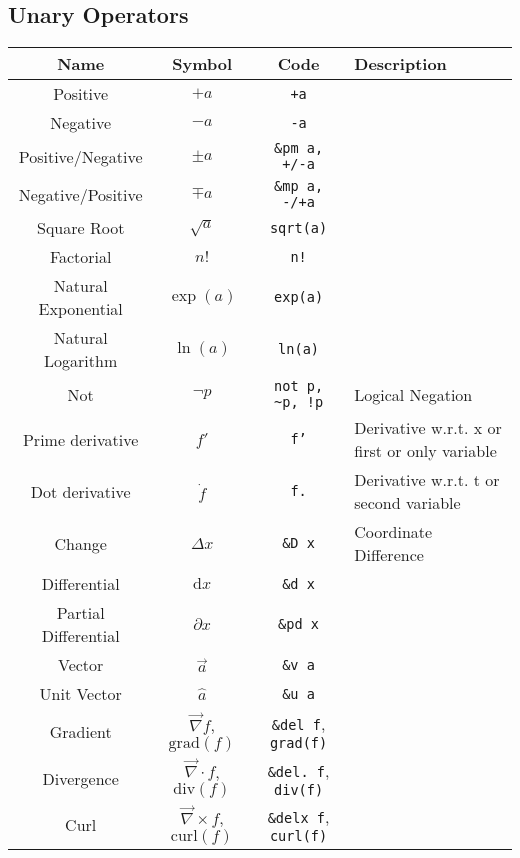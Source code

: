 \documentclass{article}
\begin{document}
  \newpage

  \subsection{Unary Operators} %
  \label{sub:unary_ops}
  \begin{table}[!h]
    \centering
    \begin{tabular}{|c|c|c|l|}
      \hline
      \textbf{Name} & \textbf{Symbol} & \textbf{Code} & \textbf{Description} \\
      \hline\hline

      Positive & \( +a \) & \texttt{+a} & \\
      Negative & \( -a \) & \texttt{-a} & \\
      Positive/Negative & \( \pm a \) & \texttt{\&pm a, +/-a} & \\
      Negative/Positive & \( \mp a \) & \texttt{\&mp a, -/+a} & \\
      Square Root & \( \sqrt{a} \) & \texttt{sqrt(a)} & \\
      Factorial & \( n! \) & \texttt{n!} & \\
      Natural Exponential & \( \exp(a) \) & \texttt{exp(a)} & \\
      Natural Logarithm & \( \ln(a) \) & \texttt{ln(a)} & \\
      Not & \( \neg p \) & \texttt{not p, \~{}p, !p} & Logical Negation \\
      \hline
      Prime derivative & \( f' \) & \texttt{f'} & Derivative w.r.t. x or first or only variable\\
      Dot derivative & \( \dot{f} \) & \texttt{f.} & Derivative w.r.t. t or second variable\\
      Change & \( \Delta x \) & \texttt{\&D x} & Coordinate Difference \\
      Differential & \( \mathrm{d}x \) & \texttt{\&d x} & \\
      Partial Differential & \( \partial x \) & \texttt{\&pd x} & \\
      Vector & \( \vec{a} \) & \texttt{\&v a} & \\
      Unit Vector & \( \hat{a} \) & \texttt{\&u a} & \\
      \hline
      Gradient & \( \vec{\nabla} f \), \( \mathrm{grad}(f) \) & \texttt{\&del f}, \texttt{grad(f)} & \\
      Divergence & \( \vec{\nabla} \cdot f \), \( \mathrm{div}(f) \) & \texttt{\&del.~f}, \texttt{div(f)} & \\
      Curl & \( \vec{\nabla} \times f \), \( \mathrm{curl}(f) \) & \texttt{\&delx f}, \texttt{curl(f)} & \\
      \hline
    \end{tabular}
  \end{table}
\end{document}
